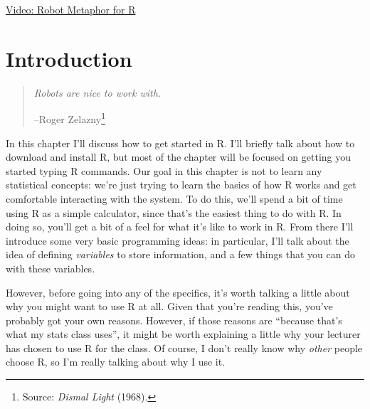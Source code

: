 \documentclass[
]{book}
\begin{document}
\href{https://youtu.be/8l43-yHsTP0}{Video: Robot Metaphor for R}

\hypertarget{introduction-1}{%
\section{Introduction}\label{introduction-1}}

\begin{quote}
\emph{Robots are nice to work with.}

--Roger Zelazny\footnote{Source: \emph{Dismal Light} (1968).}
\end{quote}

In this chapter I'll discuss how to get started in R. I'll briefly talk about how to download and install R, but most of the chapter will be focused on getting you started typing R commands. Our goal in this chapter is not to learn any statistical concepts: we're just trying to learn the basics of how R works and get comfortable interacting with the system. To do this, we'll spend a bit of time using R as a simple calculator, since that's the easiest thing to do with R. In doing so, you'll get a bit of a feel for what it's like to work in R. From there I'll introduce some very basic programming ideas: in particular, I'll talk about the idea of defining \emph{variables} to store information, and a few things that you can do with these variables.

However, before going into any of the specifics, it's worth talking a little about why you might want to use R at all. Given that you're reading this, you've probably got your own reasons. However, if those reasons are ``because that's what my stats class uses'', it might be worth explaining a little why your lecturer has chosen to use R for the class. Of course, I don't really know why \emph{other} people choose R, so I'm really talking about why I use it.
\end{document}
